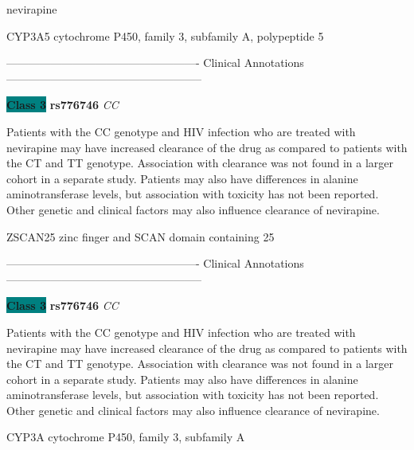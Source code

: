 \documentclass{resume} %
\begin{document}
\begin{rSection}{ nevirapine }
\begin{rSubsection}{ CYP3A5 }{ cytochrome P450, family 3, subfamily A, polypeptide 5 }{}{}
\item[] ---------------------------------------------------- Clinical Annotations -----------------------------------------------------\newline
\item \textbf{\colorbox{teal} {Class 3}} \textbf{ rs776746 } \textit{ CC }
\item[] Patients with the CC genotype and HIV infection who are treated with nevirapine may have increased clearance of the drug as compared to patients with the CT and TT genotype. Association with clearance was not found in a larger cohort in a separate study. Patients may also have differences in alanine aminotransferase levels, but association with toxicity has not been reported. Other genetic and clinical factors may also influence clearance of nevirapine.
\end{rSubsection}\begin{rSubsection}{ ZSCAN25 }{ zinc finger and SCAN domain containing 25 }{}{}
\item[]

\item[] ---------------------------------------------------- Clinical Annotations -----------------------------------------------------\newline
\item \textbf{\colorbox{teal} {Class 3}} \textbf{ rs776746 } \textit{ CC }
\item[] Patients with the CC genotype and HIV infection who are treated with nevirapine may have increased clearance of the drug as compared to patients with the CT and TT genotype. Association with clearance was not found in a larger cohort in a separate study. Patients may also have differences in alanine aminotransferase levels, but association with toxicity has not been reported. Other genetic and clinical factors may also influence clearance of nevirapine.
\end{rSubsection}\begin{rSubsection}{ CYP3A }{ cytochrome P450, family 3, subfamily A }{}{}
\item[]


\end{rSubsection}
\end{rSection}
\end{document}

